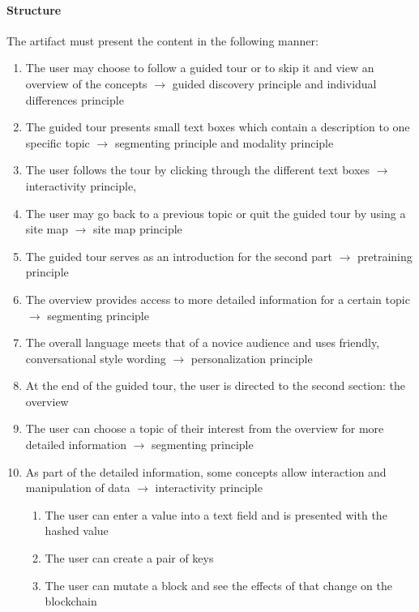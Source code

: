 \paragraph{Structure} The artifact must present the content in the following manner:
\begin{enumerate}
\setcounter{enumi}{\value{foo}}
    \item The user may choose to follow a guided tour or to skip it and view an overview of the concepts $\rightarrow$ guided discovery principle and individual differences principle
    \item The guided tour presents small text boxes which contain a description to one specific topic $\rightarrow$ segmenting principle and modality principle
    \item The user follows the tour by clicking through the different text boxes $\rightarrow$ interactivity principle, 
    \item The user may go back to a previous topic or quit the guided tour by using a site map $\rightarrow$ site map principle
    \item The guided tour serves as an introduction for the second part $\rightarrow$ pretraining principle
    \item The overview provides access to more detailed information for a certain topic $\rightarrow$ segmenting principle
    \item The overall language meets that of a novice audience and uses friendly, conversational style wording $\rightarrow$ personalization principle
    \item At the end of the guided tour, the user is directed to the second section: the overview
    \item The user can choose a topic of their interest from the overview for more detailed information $\rightarrow$ segmenting principle
    \item As part of the detailed information, some concepts allow interaction and manipulation of data $\rightarrow$ interactivity principle
    \begin{enumerate}
        \item The user can enter a value into a text field and is presented with the hashed value
        \item The user can create a pair of keys 
        \item The user can mutate a block and see the effects of that change on the blockchain
    \end{enumerate}
\setcounter{foo}{\value{enumi}}
\end{enumerate}

